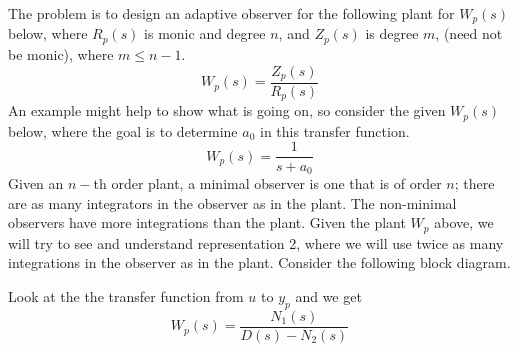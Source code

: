 The problem is to design an adaptive observer for the following plant for $W_{p}(s)$ below, where $R_{p}(s)$ is monic and degree $n$, and $Z_{p}(s)$ is degree $m$, (need not be monic), where $m\leq n-1$.
\begin{equation*}
  W_{p}(s)=
  \frac{Z_{p}(s)}{R_{p}(s)}
\end{equation*}
An example might help to show what is going on, so consider the given $W_{p}(s)$ below, where the goal is to determine $a_{0}$ in this transfer function.
\begin{equation*}
  W_{p}(s)=
  \frac{1}{s+a_{0}}
\end{equation*}
Given an $n-$th order plant, a minimal observer is one that is of order $n$; there are as many integrators in the observer as in the plant.
The non-minimal observers have more integrations than the plant.
Given the plant $W_{p}$ above, we will try to see and understand representation 2, where we will use twice as many integrations in the observer as in the plant.
Consider the following block diagram.
\begin{figure}[H]
  \begin{center}
  \end{center}
\end{figure}
Look at the the transfer function from $u$ to $y_{p}$ and we get
\begin{equation*}
  W_{p}(s)=\frac{N_{1}(s)}{D(s)-N_{2}(s)}
\end{equation*}
